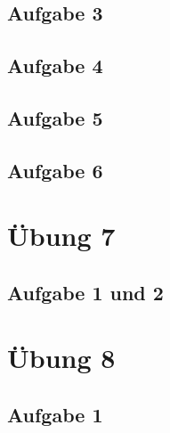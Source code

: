 \documentclass[a4paper,12pt,twoside]{article}
\theoremstyle{definition}
\begin{document}
\subsection{Aufgabe 3}

\subsection{Aufgabe 4}

\subsection{Aufgabe 5}

\subsection{Aufgabe 6}


\newpage
\section{Übung 7}
\subsection{Aufgabe 1 und 2}

		

		

		
		



\newpage
\section{Übung 8}
\subsection{Aufgabe 1}

\end{document}
